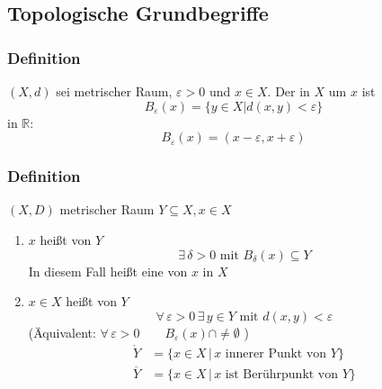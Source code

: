 \subsection{Topologische Grundbegriffe} %
\label{sub:topologische_grundbegriffe}
\subsubsection[$\varepsilon$-Ball]{Definition} %
\label{ssub:definition}
 $(X,d)$ sei metrischer Raum, $\varepsilon >0$ und $x \in X$. Der  in $X$ um $x$ ist
 \[
 	B_{\varepsilon }(x) = \{ y \in X | d(x,y)< \varepsilon \}
 \]
 in $\mathbb{R}$: \[
 	B_{\varepsilon}(x)=(x-\varepsilon ,x+ \varepsilon)
 \]
\subsubsection[Innerer Punkt, Umgebung]{Definition} %
\label{ssub:definition}
$(X,D)$ metrischer Raum $Y \subseteq X, x \in X$
\begin{enumerate}
	\item $x$ heißt  von $Y$  \[
		\exists\, \delta>0 \text{ mit } B_{\delta }(x) \subseteq Y
	\]
	In diesem Fall heißt eine  von $x$ in $X$
	\item $x \in X$ heißt  von $Y$
	\[
		\forall\, \varepsilon >0 \, \exists\, y \in Y \text{ mit } d(x,y)<\varepsilon 
	\]
	(Äquivalent: $\forall\, \varepsilon > 0 \qquad B_{\varepsilon }(x)\cap \neq \emptyset$ )
	\begin{align*}
		\mathring{Y}&= \{ x \in X \,|\, x \text{ innerer Punkt von } Y \} \\
		\overline{Y} &= \{ x \in X \,|\, x \text{ ist Berührpunkt von } Y \} 
	\end{align*}
\end{enumerate}
